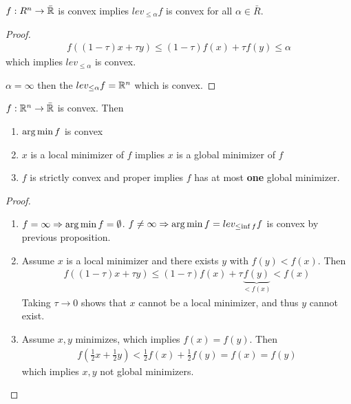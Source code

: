 \begin{proposition}
  $f: R^{n} \rightarrow \bar {\mathbb{R}}$ is convex implies $lev_{\leq \alpha}
  f$ is convex for all $\alpha \in \bar R$.
\end{proposition}

\begin{proof}
  \begin{align*}
    f((1-\tau) x + \tau y) \leq (1-\tau)f(x) + \tau f(y) \leq \alpha
  \end{align*} which implies $lev_{\leq \alpha}$ is convex.
  
  $\alpha = \infty$ then the $lev_{\leq \alpha} f = \mathbb{R}^{n}$ which is convex.
\end{proof}

\begin{thm}
  \label{defn:convexity:4}
  $f: \mathbb{R}^{n} \rightarrow \bar {\mathbb{R}}$ is convex.  Then
  \begin{enumerate}
  \item $\operatorname*{arg\,min} f$ is convex
  \item $x$ is a local minimizer of $f$ implies $x$ is a global
    minimizer of $f$
  \item $f$ is strictly convex and proper implies $f$ has at most
    \textbf{one} global minimizer.
  \end{enumerate}
\end{thm}

\begin{proof}
  \begin{enumerate}
  \item $f = \infty \Rightarrow \operatorname*{arg\,min} f = \emptyset$. $f \neq \infty
    \Rightarrow \operatorname*{arg\,min} f = lev_{\leq \inf f} f$ is convex by previous proposition.
  \item Assume $x$ is a local minimizer and there exists $y$ with
    $f(y) < f(x)$.  Then
    \begin{align*}
      f((1-\tau)x + \tau y) \leq (1-\tau) f(x) + \tau
      \underbrace{f(y)}_{< f(x)} < f(x)
    \end{align*} Taking $\tau \rightarrow 0$ shows that $x$ cannot be
    a local minimizer, and thus $y$ cannot exist.
  \item Assume $x, y$ minimizes, which implies $f(x) = f(y)$.  Then
    \begin{align*}
      f(\frac{1}{2} x + \frac{1}{2} y) < \frac{1}{2} f(x) +
      \frac{1}{2} f(y) = f(x) = f(y)
    \end{align*} which implies $x, y$ not global minimizers.
  \end{enumerate}
\end{proof}


